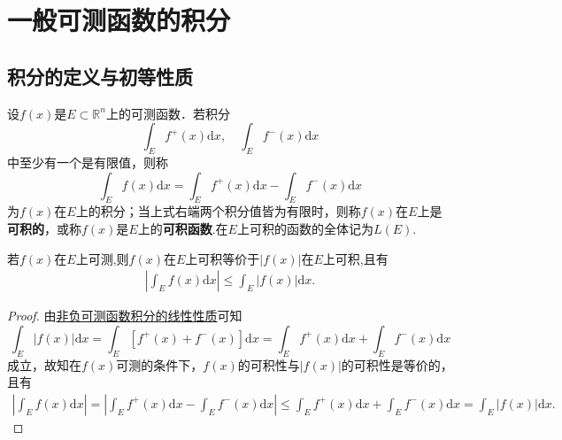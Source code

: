\documentclass[../../main.tex]{subfiles}%
\begin{document}
\section{一般可测函数的积分}

\subsection{积分的定义与初等性质}

\begin{definition}
设\(f(x)\)是\(E \subset \mathbb{R}^n\)上的可测函数．若积分
\[
\int_E f^+(x) \mathrm{d}x, \quad \int_E f^-(x) \mathrm{d}x
\]
中至少有一个是有限值，则称
\[
\int_E f(x) \mathrm{d}x = \int_E f^+(x) \mathrm{d}x - \int_E f^-(x) \mathrm{d}x
\]
为\(f(x)\)在\(E\)上的积分；当上式右端两个积分值皆为有限时，则称\(f(x)\)在\(E\)上是\textbf{可积的}，或称\(f(x)\)是\(E\)上的\textbf{可积函数}.在\(E\)上可积的函数的全体记为\(L(E)\).
\end{definition}

\begin{theorem}\label{theorem:f与f绝对值的可积性等价}
若\(f(x)\)在$E$上可测,则\(f(x)\)在$E$上可积等价于\(|f(x)|\)在$E$上可积,且有
\begin{align*}
\left| \int_E f(x) \mathrm{d}x \right| \leqslant \int_E |f(x)| \mathrm{d}x. 
\end{align*}
\end{theorem}
\begin{proof}
由\hyperref[theorem:非负可测函数积分的线性性质]{非负可测函数积分的线性性质}可知
\[
\int_E{|f(x)|\mathrm{d}x}=\int_E{\left[ f^+\left( x \right) +f^-\left( x \right) \right] \mathrm{d}x}=\int_E{f^+(x)\mathrm{d}x}+\int_E{f^-(x)\mathrm{d}x}
\]
成立，故知在\(f(x)\)可测的条件下，\(f(x)\)的可积性与\(|f(x)|\)的可积性是等价的，且有
\begin{align*}
\left| \int_E{f(x)\mathrm{d}x} \right|=\left| \int_E{f^+(x)\mathrm{d}x}-\int_E{f^-(x)\mathrm{d}x} \right|\leqslant \int_E{f^+(x)\mathrm{d}x}+\int_E{f^-(x)\mathrm{d}x}=\int_E{|f(x)|\mathrm{d}x}.
\end{align*}
\end{proof}
\end{document}
